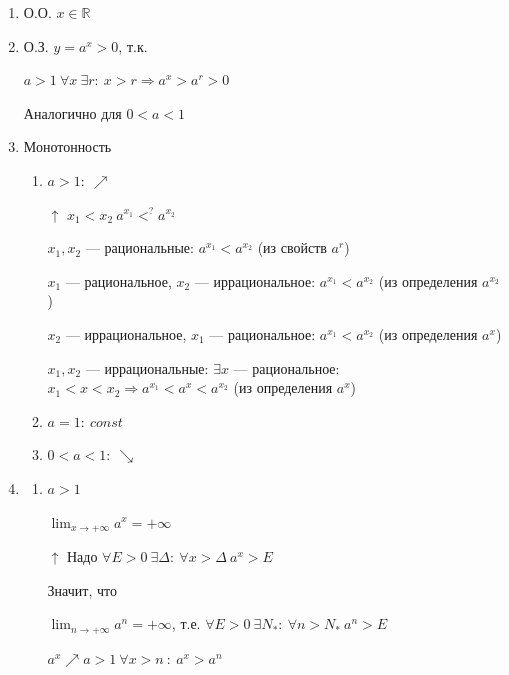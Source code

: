\documentclass{article}
\begin{document}
    \begin{enumerate}
        \item О.О. \( x \in \mathbb{R} \)

        \item О.З. \( y = a^x > 0 \), т.к.
        
        \( a > 1\ \forall x\ \exists r:\ x > r \Rightarrow a^x > a^r > 0 \)

        Аналогично для \( 0 < a < 1 \)

        \item Монотонность
        
        \begin{enumerate}
            \item \( a > 1:\ \nearrow \) 
            
            \( \uparrow \) \(x_1 < x_2\ a^{x_1} <^? a^{x_2} \)

            \( x_1, x_2 \) --- рациональные: \( a^{x_1} < a^{x_2} \) (из свойств \(a^r\))

            \( x_1 \) --- рациональное, \(x_2\) --- иррациональное: \(a^{x_1} < a^{x_2}\)  (из определения \(a^{x_2}\))
            
            \(x_2\) --- иррациональное, \(x_1\) --- рациональное: \(a^{x_1} < a^{x_2}\) (из определения \(a^x\))

            \( x_1, x_2 \) --- иррациональные: \( \exists x \) --- рациональное: \( x_1 < x < x_2 \Rightarrow a^{x_1} < a^x < a^{x_2} \) (из определения \(a^x\))
            \item \( a = 1:\ const \)
            \item \( 0 < a < 1:\ \searrow \)
        \end{enumerate}
        
        \item 
        \begin{enumerate}
            \item \(a > 1\)

            \(\lim_{x \to +\infty} a^x = +\infty\)
            
            \(\uparrow\) Надо \(\forall E > 0\ \exists \Delta:\ \forall x > \Delta\ a^x > E\)

            Значит, что 

            \( \lim_{n \to +\infty} a^n = +\infty \), т.е. \( \forall E > 0\ \exists N_*:\ \forall n > N_*\ a^n > E \)
            
            \(a^x \nearrow a > 1\ \forall x > n\ :\ a^x > a^n\)
            

\end{enumerate}
\end{enumerate}
\end{document}

